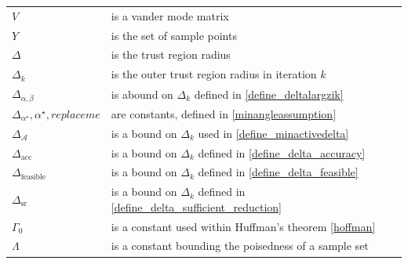 \documentclass{article}
\theoremstyle{case}
\numberwithin{theorem}{subsection}
\newcommand{\dacc}{{\Delta_{\textrm{acc}}}}
\newcommand{\deltalargzik}{{\Delta_{\alpha,\beta}}}
\newcommand{\dfeas}{{\Delta_{\textrm{feasible}}}}
\newcommand{\dk}{\Delta_k}
\newcommand{\dsr}{{\Delta_{\textrm{sr}}}}
\newcommand{\huff}{{\Gamma_0}}
\newcommand{\minactivegraddelta}{{\Delta_{\mathcal A}}}
\newcommand{\minanglealpha}{{ \alpha^{\star} }}
\newcommand{\minangledelta}{{\Delta_{\alpha^{\star}}}}
\newcommand{\minangleu}{{replace me}}
\begin{document}
\begin{longtable}{| p{} | p{} |}
$V$ & is a vander mode matrix \\ %
$Y$ & is the set of sample points \\ %
$\Delta$ & is the trust region radius \\ %
$\dk$ & is the outer trust region radius in iteration $k$ \\ %
$\deltalargzik $ & is abound on $\dk$ defined in \cref{define_deltalargzik} \\ %
$\minangledelta, \minanglealpha, \minangleu$ & are constants, defined in \cref{minangleassumption} \\ %
$\minactivegraddelta$ & is a bound on $\dk$ used in \cref{define_minactivedelta} \\ %
$\dacc$ & is a bound on $\dk$ defined in \cref{define_delta_accuracy} \\ %
$\dfeas $ & is a bound on $\dk$ defined in \cref{define_delta_feasible} \\ %
$\dsr$ & is a bound on $\dk$ defined in \cref{define_delta_sufficient_reduction} \\ %
$\huff$ & is a constant used within Huffman's theorem \cref{hoffman} \\ %
$\Lambda$ & is a constant bounding the poisedness of a sample set \\ %

\end{longtable}
\end{document}
